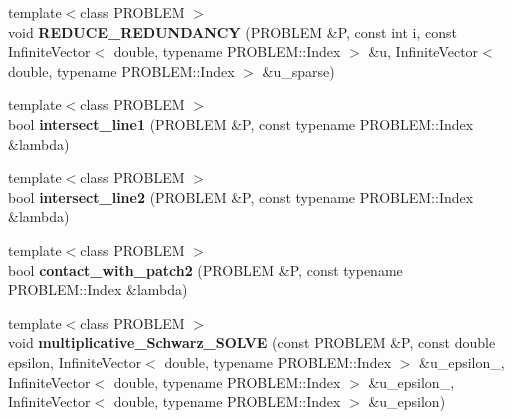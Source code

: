 \begin{CompactItemize}
\item 
\hypertarget{namespaceFrameTL_f10c19e668efd734a36e982750184b11}{
{\footnotesize template$<$class PROBLEM $>$ }\\void \textbf{REDUCE\_\-REDUNDANCY} (PROBLEM \&P, const int i, const InfiniteVector$<$ double, typename PROBLEM::Index $>$ \&u, InfiniteVector$<$ double, typename PROBLEM::Index $>$ \&u\_\-sparse)}
\label{namespaceFrameTL_f10c19e668efd734a36e982750184b11}

\item 
\hypertarget{namespaceFrameTL_6d0fc5d89ccc66faf29046d3bcfe3475}{
{\footnotesize template$<$class PROBLEM $>$ }\\bool \textbf{intersect\_\-line1} (PROBLEM \&P, const typename PROBLEM::Index \&lambda)}
\label{namespaceFrameTL_6d0fc5d89ccc66faf29046d3bcfe3475}

\item 
\hypertarget{namespaceFrameTL_7ba0009c3b5505a7a9a720663d21526d}{
{\footnotesize template$<$class PROBLEM $>$ }\\bool \textbf{intersect\_\-line2} (PROBLEM \&P, const typename PROBLEM::Index \&lambda)}
\label{namespaceFrameTL_7ba0009c3b5505a7a9a720663d21526d}

\item 
\hypertarget{namespaceFrameTL_30434f281b420f817ba55886c5b1bd82}{
{\footnotesize template$<$class PROBLEM $>$ }\\bool \textbf{contact\_\-with\_\-patch2} (PROBLEM \&P, const typename PROBLEM::Index \&lambda)}
\label{namespaceFrameTL_30434f281b420f817ba55886c5b1bd82}

\item 
\hypertarget{namespaceFrameTL_8d41aa77fa6da618ad97ddc75c920a55}{
{\footnotesize template$<$class PROBLEM $>$ }\\void \textbf{multiplicative\_\-Schwarz\_\-SOLVE} (const PROBLEM \&P, const double epsilon, InfiniteVector$<$ double, typename PROBLEM::Index $>$ \&u\_\-epsilon\_, InfiniteVector$<$ double, typename PROBLEM::Index $>$ \&u\_\-epsilon\_, InfiniteVector$<$ double, typename PROBLEM::Index $>$ \&u\_\-epsilon)}
\label{namespaceFrameTL_8d41aa77fa6da618ad97ddc75c920a55}


\end{CompactItemize}
